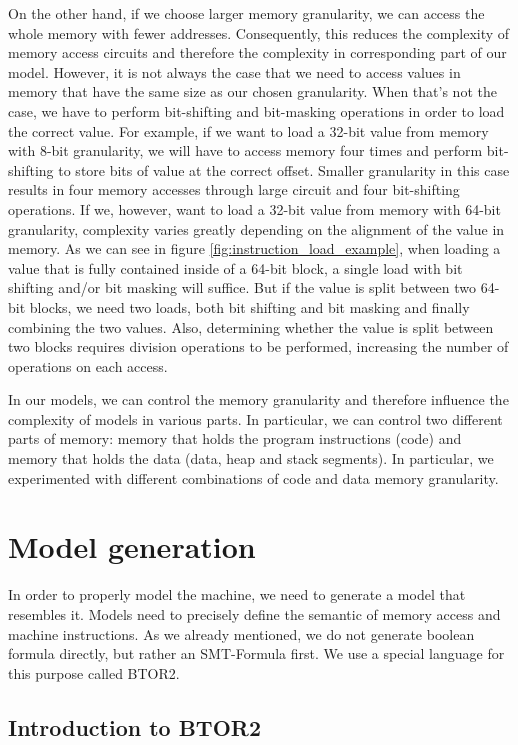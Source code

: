 \documentclass[12pt]{article}
\begin{document}
On the other hand, if we choose larger memory granularity, we can access the
whole memory with fewer addresses. Consequently, this reduces the complexity of
memory access circuits and therefore the complexity in corresponding part of
our model. However, it is not always the case that we need to access values in
memory that have the same size as our chosen granularity. When that's not the
case, we have to perform bit-shifting and bit-masking operations in order to
load the correct value. For example, if we want to load a 32-bit value from
memory with 8-bit granularity, we will have to access memory four times and
perform bit-shifting to store bits of value at the correct offset. Smaller
granularity in this case results in four memory accesses through large circuit
and four bit-shifting operations. If we, however, want to load a 32-bit value
from memory with 64-bit granularity, complexity varies greatly depending on the
alignment of the value in memory. As we can see in figure
\ref{fig:instruction_load_example}, when loading a value that is fully
contained inside of a 64-bit block, a single load with bit shifting and/or bit
masking will suffice. But if the value is split between two 64-bit blocks, we
need two loads, both bit shifting and bit masking and finally combining the two
values. Also, determining whether the value is split between two blocks
requires division operations to be performed, increasing the number of
operations on each access.

In our models, we can control the memory granularity and therefore influence
the complexity of models in various parts. In particular, we can control two
different parts of memory: memory that holds the program instructions (code)
and memory that holds the data (data, heap and stack segments). In particular,
we experimented with different combinations of code and data memory
granularity.


\section{Model generation}

In order to properly model the machine, we need to generate a model that
resembles it. Models need to precisely define the semantic of memory access and
machine instructions. As we already mentioned, we do not generate boolean
formula directly, but rather an SMT-Formula first. We use a special language
for this purpose called BTOR2.

\subsection{Introduction to BTOR2}
\end{document}
